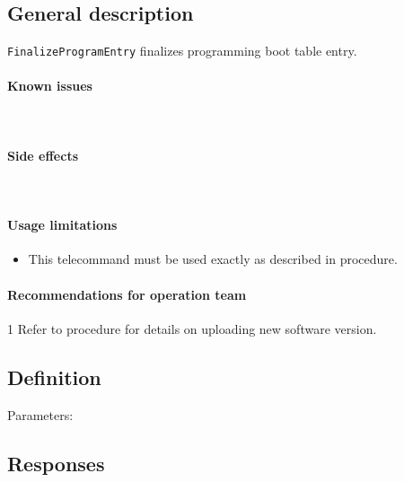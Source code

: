 

\subsection{General description}
\texttt{FinalizeProgramEntry} finalizes programming boot table entry.


\paragraph{Known issues}\mbox{}\\ 
\None

\paragraph{Side effects}\mbox{}\\ 
\None

\paragraph{Usage limitations}
\begin{itemize}
	\item This telecommand must be used exactly as described in  procedure.
\end{itemize}

\paragraph{Recommendations for operation team}1
Refer to  procedure for details on uploading new software version.


\subsection{Definition}

Parameters: 

\begin{tcarglist}
\end{tcarglist}


\subsection{Responses}

